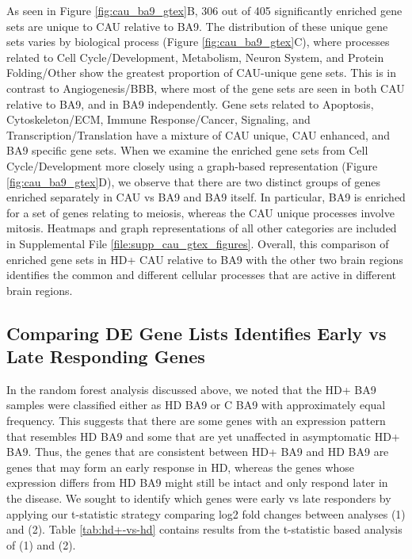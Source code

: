 \documentclass[fleqn,10pt,table]{wlscirep}
\begin{document}
As seen in Figure \ref{fig:cau_ba9_gtex}B, 306 out of 405 significantly enriched gene sets are unique to CAU relative to BA9.
The distribution of these unique gene sets varies by biological process (Figure \ref{fig:cau_ba9_gtex}C), where processes related to Cell Cycle/Development, Metabolism, Neuron System, and Protein Folding/Other show the greatest proportion of CAU-unique gene sets.
This is in contrast to Angiogenesis/BBB, where most of the gene sets are seen in both CAU relative to BA9, and in BA9 independently.
Gene sets related to Apoptosis, Cytoskeleton/ECM, Immune Response/Cancer, Signaling, and Transcription/Translation have a mixture of CAU unique, CAU enhanced, and BA9 specific gene sets.
When we examine the enriched gene sets from Cell Cycle/Development more closely using a graph-based representation (Figure \ref{fig:cau_ba9_gtex}D), we observe that there are two distinct groups of genes enriched separately in CAU vs BA9 and BA9 itself.
In particular, BA9 is enriched for a set of genes relating to meiosis, whereas the CAU unique processes involve mitosis.
Heatmaps and graph representations of all other categories are included in Supplemental File \ref{file:supp_cau_gtex_figures}.
Overall, this comparison of enriched gene sets in HD+ CAU relative to BA9 with the other two brain regions identifies the common and different cellular processes that are active in different brain regions.

\subsection{Comparing DE Gene Lists Identifies Early vs Late Responding Genes}

In the random forest analysis discussed above, we noted that the HD+ BA9 samples were classified either as HD BA9 or C BA9 with approximately equal frequency.
This suggests that there are some genes with an expression pattern that resembles HD BA9 and some that are yet unaffected in asymptomatic HD+ BA9.
Thus, the genes that are consistent between HD+ BA9 and HD BA9 are genes that may form an early response in HD, whereas the genes whose expression differs from HD BA9 might still be intact and only respond later in the disease.
We sought to identify which genes were early vs late responders by applying our t-statistic strategy comparing log2 fold changes between analyses (1) and (2).
Table \ref{tab:hd+-vs-hd} contains results from the t-statistic based analysis of (1) and (2).
\end{document}
